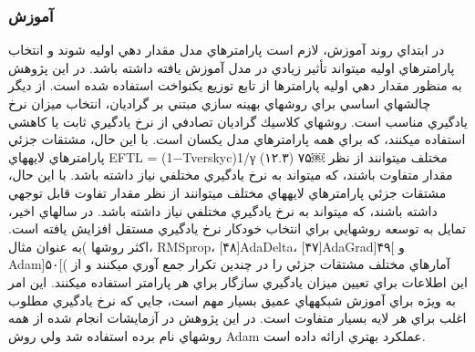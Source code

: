 \subsubsection{آموزش‌}
در ابتداي روند آموزش، لازم است پارامترهاي مدل مقدار دهي اوليه شوند و انتخاب پارامترهاي اوليه ميتواند تأثير زيادي در مدل آموزش يافته داشته باشد. در اين پژوهش به منظور مقدار دهي اوليه پارامترها از تابع توزيع يكنواخت استفاده شده است. از ديگر چالشهاي اساسي براي روشهاي بهينه سازي مبتني بر گراديان، انتخاب ميزان نرخ يادگيري مناسب است. روشهاي كلاسيك گراديان تصادفي از نرخ يادگيري ثابت يا كاهشي استفاده ميكنند، كه براي همه پارامترهاي مدل يكسان است. با اين حال، مشتقات جزئي پارامترهاي لايههاي
EFTL =
(1−Tverskyc)1/γ (۱۲.۳)
۷۵￼
مختلف ميتوانند از نظر مقدار متفاوت باشند، كه ميتواند به نرخ يادگيري مختلفي نياز داشته باشد. با اين حال، مشتقات جزئي پارامترهاي لايههاي مختلف ميتوانند از نظر مقدار تفاوت قابل توجهي داشته باشند، كه ميتواند به نرخ يادگيري مختلفي نياز داشته باشد. در سالهاي اخير، تمايل به توسعه روشهايي براي انتخاب خودكار نرخ يادگيري مستقل افزايش يافته است. اكثر روشها )به عنوان مثال، RMSprop، [۴۸]AdaDelta، [۴۷]AdaGrad]۴۹[ و Adam]۵۰[( آمارهاي مختلف مشتقات جزئي را در چندين تكرار جمع آوري ميكنند و از اين اطلاعات براي تعيين ميزان يادگيري سازگار براي هر پارامتر استفاده ميكنند. اين امر به ويژه براي آموزش شبكههاي عميق بسيار مهم است، جايي كه نرخ يادگيري مطلوب اغلب براي هر لايه بسيار متفاوت است. در اين پژوهش در آزمايشات انجام شده از همه روشهاي نام برده استفاده شد ولي روش Adam عملكرد بهتري ارائه داده است.


